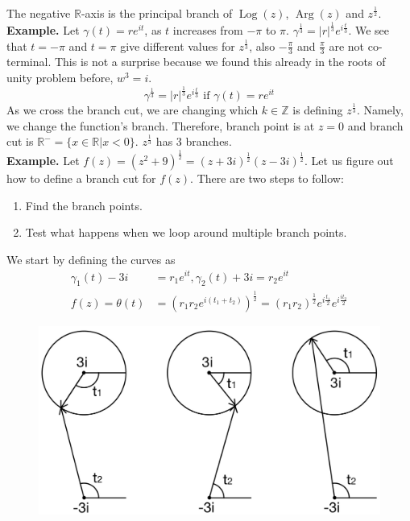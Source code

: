 \documentclass[11pt]{article}
\begin{document}
The negative $\mathbb{R}$-axis is the principal branch of $\operatorname{Log}(z)$, $\operatorname{Arg}(z)$ and $z^{\frac{1}{2}}$.\\
\newline
\textbf{Example.} Let $\gamma(t) = re^{it}$, as $t$ increases from $-\pi$ to $\pi$. $\gamma^{\frac{1}{3}} = |r|^{\frac{1}{3}}e^{i\frac{t}{3}}$. We see that $t = -\pi$ and $t = \pi$ give different values for $z^{\frac{1}{3}}$, also $-\frac{\pi}{3}$ and $\frac{\pi}{3}$ are not co-terminal. This is not a surprise because we found this already in the roots of unity problem before, $w^3 = i$. 
$$ \gamma^{\frac{1}{3}} = |r|^{\frac{1}{3}}e^{i\frac{t}{3}} \text{ if } \gamma(t) = re^{it}$$
As we cross the branch cut, we are changing which $k \in \mathbb{Z}$ is defining $z^{\frac{1}{3}}$. Namely, we change the function's branch. Therefore, branch point is at $z = 0$ and branch cut is $\mathbb{R}^{-} = \{x \in \mathbb{R}|x<0\}$. $z^{\frac{1}{3}}$ has 3 branches. \\
\newline
\textbf{Example.} Let $f(z) = \left(z^2 + 9\right)^{\frac{1}{2}} = (z + 3i)^{\frac{1}{2}}(z - 3i)^{\frac{1}{2}}$. Let us figure out how to define a branch cut for $f(z)$. There are two steps to follow: 
\begin{enumerate}[leftmargin = *, nolistsep]
\item Find the branch points.
\item Test what happens when we loop around multiple branch points.
\end{enumerate}
We start by defining the curves as 
\begin{align*}
\gamma_1(t) - 3i &= r_1e^{it}, \gamma_2(t) + 3i = r_2e^{it} \\
f(z) = \theta(t) &= \left(r_1r_2e^{i(t_1 + t_2)}\right)^{\frac{1}{2}} = (r_1r_2)^{\frac{1}{2}}e^{i\frac{t_1}{2}}e^{i\frac{it_2}{2}}
\end{align*}
\begin{figure}[H]
\includegraphics[scale = 0.2]{5_5}
\centering
\end{figure}
\end{document}
